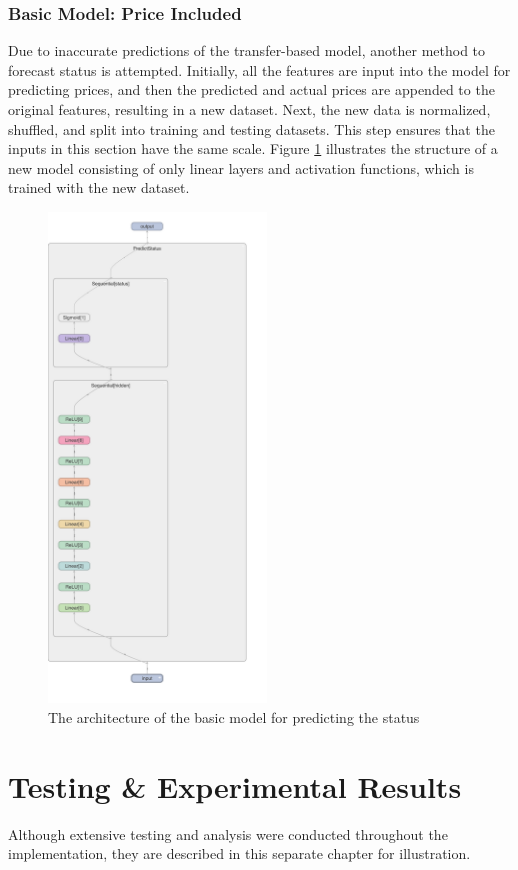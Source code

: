 \documentclass[12pt,twoside]{report}
\begin{document}
\subsection{Basic Model: Price Included}
\label{basic_status_include}
Due to inaccurate predictions of the transfer-based model, another method to forecast status is attempted. Initially, all the features are input into the model for predicting prices, and then the predicted and actual prices are appended to the original features, resulting in a new dataset. Next, the new data is normalized, shuffled, and split into training and testing datasets. This step ensures that the inputs in this section have the same scale. Figure \ref{basic_status_layout} illustrates the structure of a new model consisting of only linear layers and activation functions, which is trained with the new dataset.

\begin{figure}[!htbp]
	\centering
	\includegraphics[height=13cm]{basic_status_layout}
	\caption{The architecture of the basic model for predicting the status}
	\label{basic_status_layout}
\end{figure}

\chapter{Testing \& Experimental Results}
Although extensive testing and analysis were conducted throughout the implementation, they are described in this separate chapter for illustration. 
\end{document}
